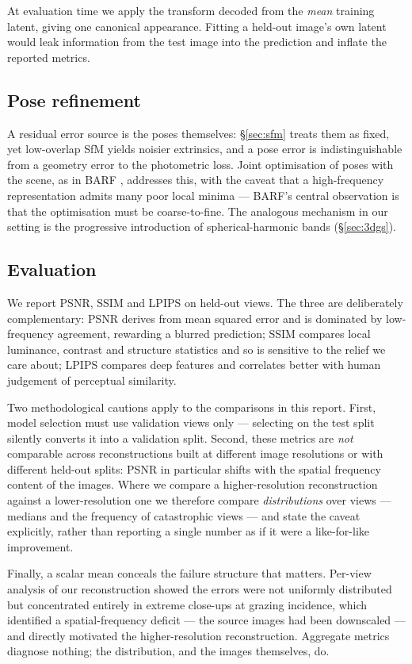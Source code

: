 At evaluation time we apply the transform decoded from the \emph{mean} training
latent, giving one canonical appearance. Fitting a held-out image's own latent
would leak information from the test image into the prediction and inflate the
reported metrics.

\subsection{Pose refinement}
\label{sec:pose}

A residual error source is the poses themselves: \S\ref{sec:sfm} treats them as
fixed, yet low-overlap SfM yields noisier extrinsics, and a pose error is
indistinguishable from a geometry error to the photometric loss. Joint
optimisation of poses with the scene, as in BARF \cite{lin2021barf}, addresses
this, with the caveat that a high-frequency representation admits many poor local
minima --- BARF's central observation is that the optimisation must be coarse-to-fine.
The analogous mechanism in our setting is the progressive introduction of
spherical-harmonic bands (\S\ref{sec:3dgs}).

\subsection{Evaluation}
\label{sec:eval}

We report PSNR, SSIM \cite{wang2004ssim} and LPIPS \cite{zhang2018lpips} on
held-out views. The three are deliberately complementary: PSNR derives from mean
squared error and is dominated by low-frequency agreement, rewarding a blurred
prediction; SSIM compares local luminance, contrast and structure statistics and
so is sensitive to the relief we care about; LPIPS compares deep features and
correlates better with human judgement of perceptual similarity.

Two methodological cautions apply to the comparisons in this report. First, model
selection must use validation views only --- selecting on the test split silently
converts it into a validation split. Second, these metrics are \emph{not}
comparable across reconstructions built at different image resolutions or with
different held-out splits: PSNR in particular shifts with the spatial frequency
content of the images. Where we compare a higher-resolution reconstruction against
a lower-resolution one we therefore compare \emph{distributions} over views ---
medians and the frequency of catastrophic views --- and state the caveat
explicitly, rather than reporting a single number as if it were a like-for-like
improvement.

Finally, a scalar mean conceals the failure structure that matters. Per-view
analysis of our reconstruction showed the errors were not uniformly distributed
but concentrated entirely in extreme close-ups at grazing incidence, which
identified a spatial-frequency deficit --- the source images had been downscaled
--- and directly motivated the higher-resolution reconstruction. Aggregate metrics
diagnose nothing; the distribution, and the images themselves, do.
